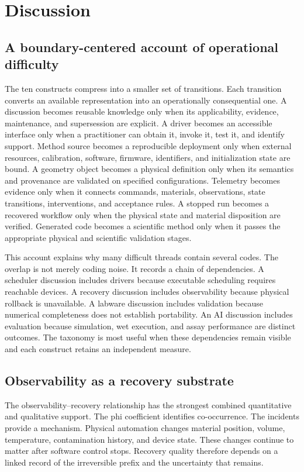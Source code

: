 \section{Discussion}
\label{sec:discussion}

\subsection{A boundary-centered account of operational difficulty}

The ten constructs compress into a smaller set of transitions. Each transition converts an available representation into an operationally consequential one. A discussion becomes reusable knowledge only when its applicability, evidence, maintenance, and supersession are explicit. A driver becomes an accessible interface only when a practitioner can obtain it, invoke it, test it, and identify support. Method source becomes a reproducible deployment only when external resources, calibration, software, firmware, identifiers, and initialization state are bound. A geometry object becomes a physical definition only when its semantics and provenance are validated on specified configurations. Telemetry becomes evidence only when it connects commands, materials, observations, state transitions, interventions, and acceptance rules. A stopped run becomes a recovered workflow only when the physical state and material disposition are verified. Generated code becomes a scientific method only when it passes the appropriate physical and scientific validation stages.

This account explains why many difficult threads contain several codes. The overlap is not merely coding noise. It records a chain of dependencies. A scheduler discussion includes drivers because executable scheduling requires reachable devices. A recovery discussion includes observability because physical rollback is unavailable. A labware discussion includes validation because numerical completeness does not establish portability. An AI discussion includes evaluation because simulation, wet execution, and assay performance are distinct outcomes. The taxonomy is most useful when these dependencies remain visible and each construct retains an independent measure.

\subsection{Observability as a recovery substrate}

The observability--recovery relationship has the strongest combined quantitative and qualitative support. The phi coefficient identifies co-occurrence. The incidents provide a mechanism. Physical automation changes material position, volume, temperature, contamination history, and device state. These changes continue to matter after software control stops. Recovery quality therefore depends on a linked record of the irreversible prefix and the uncertainty that remains.

